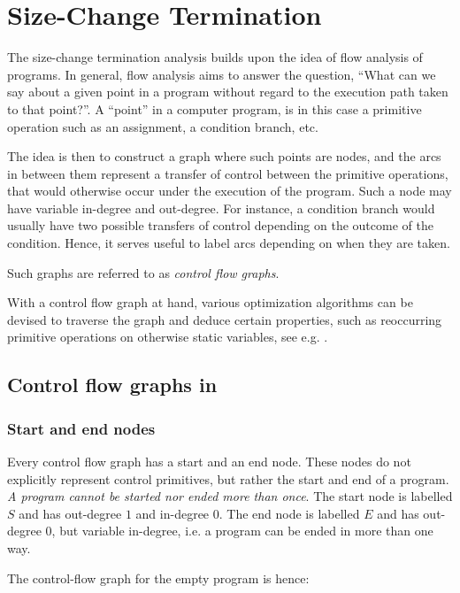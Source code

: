 \chapter{Size-Change Termination}

The size-change termination analysis builds upon the idea of flow analysis of
programs. In general, flow analysis aims to answer the question, ``What can we
say about a given point in a program without regard to the execution path taken
to that point?''. A ``point'' in a computer program, is in this case a primitive
operation such as an assignment, a condition branch, etc.

The idea is then to construct a graph where such points are nodes, and the arcs
in between them represent a transfer of control between the primitive
operations, that would otherwise occur under the execution of the program.
Such a node may have variable in-degree and out-degree. For instance, a
condition branch would usually have two possible transfers of control depending
on the outcome of the condition. Hence, it serves useful to label arcs
depending on when they are taken.

Such graphs are referred to as \emph{control flow graphs}.

With a control flow graph at hand, various optimization algorithms can be
devised to traverse the graph and deduce certain properties, such as
reoccurring primitive operations on otherwise static variables, see e.g.
\cite{kildall}.

\section{Control flow graphs in \D{}}

\subsection{Start and end nodes}

Every control flow graph has a start and an end node. These nodes do not
explicitly represent control primitives, but rather the start and end of a
program. \emph{A program cannot be started nor ended more than once}. The start
node is labelled $S$ and has out-degree $1$ and in-degree $0$. The end node is
labelled $E$ and has out-degree $0$, but variable in-degree, i.e. a program can
be ended in more than one way.

The control-flow graph for the empty program is hence:



